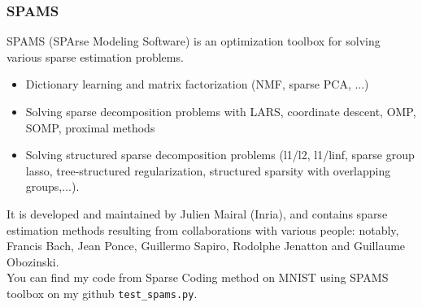 \documentclass[a4paper,10pt]{article}
\begin{document}
\subsubsection{SPAMS}
SPAMS (SPArse Modeling Software) is an optimization toolbox for solving various sparse estimation problems.
\begin{itemize}
 \item Dictionary learning and matrix factorization (NMF, sparse PCA, ...)
 \item Solving sparse decomposition problems with LARS, coordinate descent, OMP, SOMP, proximal methods
 \item Solving structured sparse decomposition problems (l1/l2, l1/linf, sparse group lasso, tree-structured regularization, structured sparsity with overlapping groups,...).
\end{itemize}
It is developed and maintained by Julien Mairal (Inria), and contains sparse estimation methods resulting from collaborations with various people: notably, Francis Bach, Jean Ponce, Guillermo Sapiro, Rodolphe Jenatton and Guillaume Obozinski.\\
You can find my code from Sparse Coding method on MNIST using SPAMS toolbox on my github \texttt{test\_spams.py}.\\
\newpage
\end{document}
